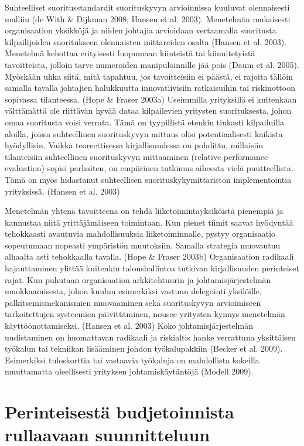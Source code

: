 \documentclass[12pt,a4paper,oneside,pdftex]{report}
\begin{document}
Suhteelliset suoritusstandardit suorituskyvyn arvioinnissa kuuluvat olennaisesti malliin (de With & Dijkman 2008; Hansen et al. 2003). Menetelmän mukaisesti organisaation yksikköjä ja niiden johtajia arvioidaan vertaamalla suoritusta kilpailijoiden suoritukseen olennaisten mittareiden osalta (Hansen et al. 2003). Menetelmä kehottaa erityisesti luopumaan kiinteistä tai kiinnitetyistä tavoitteista, jolloin tarve numeroiden manipuloinnille jää pois (Daum et al. 2005). Myöskään uhka siitä, mitä tapahtuu, jos tavoitteisiin ei päästä, ei rajoita tällöin samalla tavalla johtajien halukkuutta innovatiivisiin ratkaisuihin tai riskinottoon sopivassa tilanteessa. (Hope & Fraser 2003a) Useimmilla yrityksillä ei kuitenkaan välttämättä ole riittävän hyvää dataa kilpailevien yritysten suorituksesta, johon omaa suoritusta voisi verrata. Tämä on tyypillistä etenkin tiukasti kilpailuilla aloilla, joissa suhteellinen suorituskyvyn mittaus olisi potentiaalisesti kaikista hyödyllisin. Vaikka teoreettisessa kirjallisuudessa on pohdittu, millaisiin tilanteisiin suhteellinen suorituskyvyn mittaaminen (relative performance evaluation) sopisi parhaiten, on empiirinen tutkimus aiheesta vielä puutteellista. Tämä on myös hidastanut suhteellisen suorituskykymittariston implementointia yrityksissä. (Hansen et al. 2003)

Menetelmän yhtenä tavoitteena on tehdä liiketoimintayksiköistä pienempiä ja kannustaa niitä yrittäjämäiseen toimintaan. Kun pienet tiimit saavat hyödyntää tehokkaasti avautuvia mahdollisuuksia liiketoiminnalle, pystyy organisaatio sopeutumaan nopeasti ympäristön muutoksiin. Samalla strategia muovautuu alhaalta asti tehokkaalla tavalla. (Hope & Fraser 2003b) Organisaation radikaali hajauttaminen ylittää kuitenkin taloushallintoa tutkivan kirjallisuuden perinteiset rajat. Kun puhutaan organisaation arkkitehtuurin ja johtamisjärjestelmän muokkaamisesta, johon kuuluu esimerkiksi vastuun delegointi yksilöille, palkitsemismekanismien muovaaminen sekä suorituskyvyn arvioimiseen tarkoitettujen systeemien päivittäminen, nousee yritysten kynnys menetelmän käyttöönottamiseksi. (Hansen et al. 2003) Koko johtamisjärjestelmän uudistaminen on huomattavan radikaali ja riskialtis hanke verrattuna yksittäisen työkalun tai tekniikan lisääminen johdon työkalupakkiin (Becker et al. 2009). Esimerkiksi tuloskorttia tai vastaavia työkaluja on mahdollista kokeilla muuttamatta oleellisesti yrityksen johtamiskäytäntöjä (Modell 2009).

\chapter{Perinteisestä budjetoinnista rullaavaan suunnitteluun}
\end{document}

